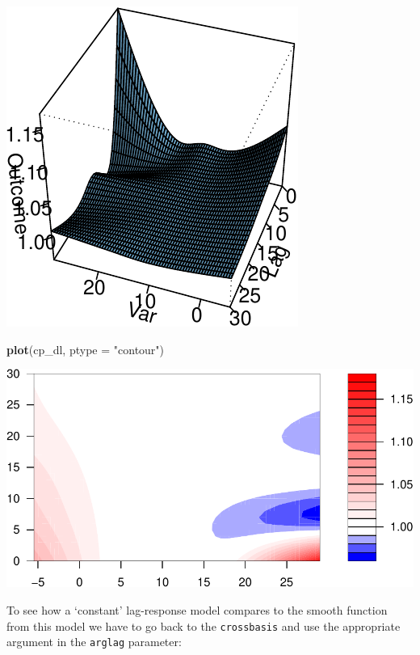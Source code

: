 \documentclass[
]{book}
\newenvironment{Shaded}{\begin{snugshade}}{\end{snugshade}}
\newcommand{\DataTypeTok}[1]{\textcolor[rgb]{0.13,0.29,0.53}{#1}}
\newcommand{\DecValTok}[1]{\textcolor[rgb]{0.00,0.00,0.81}{#1}}
\newcommand{\KeywordTok}[1]{\textcolor[rgb]{0.13,0.29,0.53}{\textbf{#1}}}
\newcommand{\NormalTok}[1]{#1}
\newcommand{\OperatorTok}[1]{\textcolor[rgb]{0.81,0.36,0.00}{\textbf{#1}}}
\newcommand{\StringTok}[1]{\textcolor[rgb]{0.31,0.60,0.02}{#1}}
\begin{document}
\includegraphics{adv_epi_analysis_files/figure-latex/unnamed-chunk-107-1.pdf}

\begin{Shaded}
\begin{Highlighting}[]
\KeywordTok{plot}\NormalTok{(cp_dl, }\DataTypeTok{ptype =} \StringTok{"contour"}\NormalTok{)}
\end{Highlighting}
\end{Shaded}

\includegraphics{adv_epi_analysis_files/figure-latex/unnamed-chunk-107-2.pdf}

To see how a `constant' lag-response model compares to the smooth function from this model we have to go back to the \texttt{crossbasis} and use the appropriate argument in the \texttt{arglag} parameter:

\begin{Shaded}
\end{Shaded}
\end{document}
